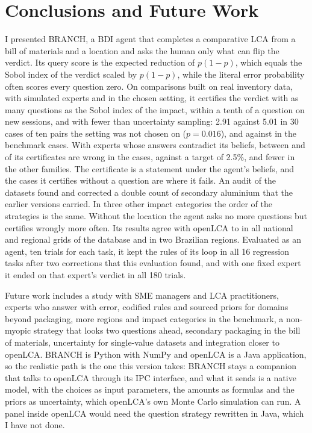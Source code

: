 \documentclass{article}
\begin{document}
\section{Conclusions and Future Work}\label{sec:conclusions}

I presented BRANCH, a BDI agent that completes a comparative LCA from a bill of materials and a location
and asks the human only what can flip the verdict. Its query score is the expected reduction of
$p(1-p)$, which equals the Sobol index of the verdict scaled by $p(1-p)$, while the literal error
probability often scores every question zero. On comparisons built on real inventory data, with simulated
experts and in the chosen setting, it certifies the verdict with as many questions as the Sobol index of
the impact, within a tenth of a question on new sessions, and with fewer than uncertainty sampling: 2.91
against 5.01 in 30 cases of ten pairs the setting was not chosen on ($p=0.016$), and \qFlipChosen{} against
\qEntChosen{} in the \nCases{} benchmark cases. With experts whose answers contradict its beliefs, between
\wFlipHoldThree{} and \wFlipChosenTails{} of its certificates are wrong in the \nCases{} cases, against a
target of 2.5\%, and fewer in the other families. The certificate is a statement under the agent's
beliefs, and the cases it certifies without a question are where it fails. An audit of the datasets found
and corrected a double count of secondary aluminium that the earlier versions carried.
In three other impact categories the order of the strategies is the same. Without the location the agent asks no more questions but certifies wrongly more often.
Its results agree with openLCA to \maxDiffGrids{} in all \nGrids{} national and regional grids of the
database and in two Brazilian regions. Evaluated as an agent, ten trials for each task, it kept the rules of its
loop in all 16 regression tasks after two corrections that this evaluation found, and with one fixed expert it
ended on that expert's verdict in all 180 trials.

Future work includes a study with SME managers and LCA practitioners, experts who answer with error,
codified rules and sourced priors for domains beyond packaging, more regions and impact categories in the benchmark, a non-myopic strategy that looks two questions ahead,
secondary packaging in the bill of materials, uncertainty for single-value datasets and integration closer
to openLCA. BRANCH is Python with NumPy and openLCA is a Java application, so the realistic path is the one
this version takes: BRANCH stays a companion that talks to openLCA through its IPC interface, and what it
sends is a native model, with the choices as input parameters, the amounts as formulas and the priors as
uncertainty, which openLCA's own Monte Carlo simulation can run. A panel inside openLCA would need the
question strategy rewritten in Java, which I have not done.
\end{document}

